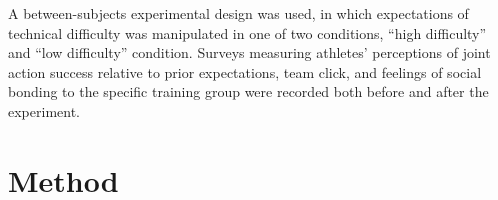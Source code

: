 \documentclass[english]{article}\usepackage[]{graphicx}\usepackage[]{color}
\begin{document}
A between-subjects experimental design was used, in which expectations of technical difficulty was manipulated in one of two conditions, ``high difficulty'' and ``low difficulty'' condition.  Surveys measuring athletes' perceptions of joint action success relative to prior expectations, team click, and feelings of social bonding to the specific training group were recorded both before and after the experiment.


























\section{Method}

\end{document}
